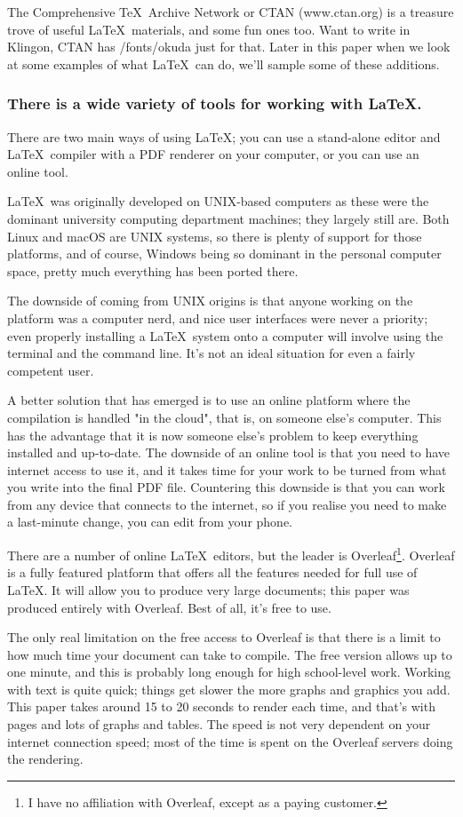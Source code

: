 \documentclass[12pt]{extarticle}
\begin{document}
The Comprehensive \TeX\ Archive Network or CTAN (www.ctan.org) is a treasure trove of useful \LaTeX\ materials, and some fun ones too. Want to write in Klingon, CTAN has /fonts/okuda just for that. Later in this paper when we look at some examples of what \LaTeX\ can do, we'll sample some of these additions.
\subsubsection{There is a wide variety of tools for working with \LaTeX.}
There are two main ways of using \LaTeX; you can use a stand-alone editor and \LaTeX\ compiler with a PDF renderer on your computer, or you can use an online tool.

\LaTeX\ was originally developed on UNIX-based computers as these were the dominant university computing department machines; they largely still are. Both Linux and macOS are UNIX systems, so there is plenty of support for those platforms, and of course, Windows being so dominant in the personal computer space, pretty much everything has been ported there.

The downside of coming from UNIX origins is that anyone working on the platform was a computer nerd, and nice user interfaces were never a priority; even properly installing a \LaTeX\ system onto a computer will involve using the terminal and the command line. It's not an ideal situation for even a fairly competent user.

A better solution that has emerged is to use an online platform where the compilation is handled "in the cloud", that is, on someone else's computer. This has the advantage that it is now someone else's problem to keep everything installed and up-to-date. The downside of an online tool is that you need to have internet access to use it, and it takes time for your work to be turned from what you write into the final PDF file. Countering this downside is that you can work from any device that connects to the internet, so if you realise you need to make a last-minute change, you can edit from your phone.

There are a number of online \LaTeX\ editors, but the leader is Overleaf\footnote{I have no affiliation with Overleaf, except as a paying customer.}. Overleaf is a fully featured platform that offers all the features needed for full use of \LaTeX. It will allow you to produce very large documents; this paper was produced entirely with Overleaf. Best of all, it's free to use.

The only real limitation on the free access to Overleaf is that there is a limit to how much time your document can take to compile. The free version allows up to one minute, and this is probably long enough for high school-level work. Working with text is quite quick; things get slower the more graphs and graphics you add. This paper takes around 15 to 20 seconds to render each time, and that's with \pageref{lastpage} pages and lots of graphs and tables. The speed is not very dependent on your internet connection speed; most of the time is spent on the Overleaf servers doing the rendering.
\end{document}
